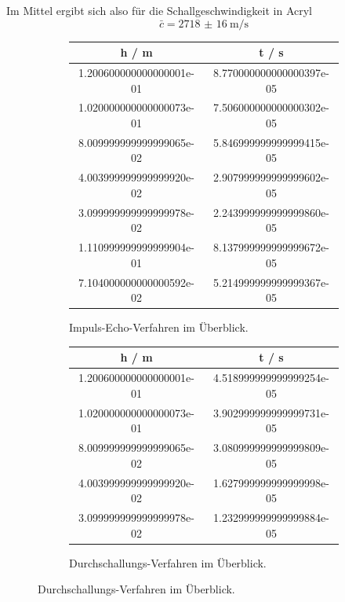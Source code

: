 Im Mittel ergibt sich also für die Schallgeschwindigkeit in Acryl
\begin{equation*}
  \bar{c} = \SI{2718(16)}{\meter \per \second}
\end{equation*}
\begin{figure}
  \centering
  \caption{Werte des}
  \begin{subfigure}{0.48\textwidth}
    \caption{Impuls-Echo-Verfahren im Überblick.}
    \begin{tabular}{S S}
      \toprule
      h / \si{\meter} & t / \si{\second} \\
      \midrule
      1.200600000000000001e-01 & 8.770000000000000397e-05\\
      1.020000000000000073e-01 & 7.506000000000000302e-05\\
      8.009999999999999065e-02 & 5.846999999999999415e-05\\
      4.003999999999999920e-02 & 2.907999999999999602e-05\\
      3.099999999999999978e-02 & 2.243999999999999860e-05\\
      1.110999999999999904e-01 & 8.137999999999999672e-05\\
      7.104000000000000592e-02 & 5.214999999999999367e-05\\
      \bottomrule
    \end{tabular}
    \label{tab:IE}
  \end{subfigure}
  \begin{subfigure}{0.48\textwidth}
    \caption{Durchschallungs-Verfahren im Überblick.}
    \begin{tabular}{S S}
      \toprule
      h / \si{\meter} & t / \si{\second} \\
      \midrule
      1.200600000000000001e-01 & 4.518999999999999254e-05\\
      1.020000000000000073e-01 & 3.902999999999999731e-05\\
      8.009999999999999065e-02 & 3.080999999999999809e-05\\
      4.003999999999999920e-02 & 1.627999999999999998e-05\\
      3.099999999999999978e-02 & 1.232999999999999884e-05\\
      \bottomrule
    \end{tabular}
    \label{tab:DS}
  \end{subfigure}
  \label{tab:Tabs}
\end{figure}




